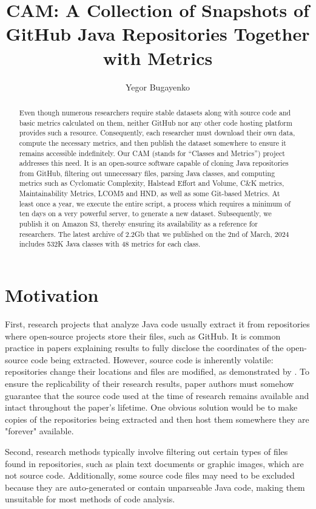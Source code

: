 \documentclass[11pt,sigplan,nonacm]{acmart}
\title{CAM: A Collection of Snapshots of GitHub Java Repositories Together with Metrics}
\author{Yegor Bugayenko}
\affiliation{\institution{Huawei, Russia, Moscow}\city{}\country{}}
\newcommand\cam{{\sffamily CAM}}
\begin{document}
\begin{abstract}
Even though numerous researchers require stable datasets along with source code and basic metrics calculated on them, neither GitHub nor any other code hosting platform provides such a resource. Consequently, each researcher must download their own data, compute the necessary metrics, and then publish the dataset somewhere to ensure it remains accessible indefinitely. Our \cam{} (stands for ``Classes and Metrics'') project addresses this need. It is an open-source software capable of cloning Java repositories from GitHub, filtering out unnecessary files, parsing Java classes, and computing metrics such as Cyclomatic Complexity, Halstead Effort and Volume, C\&K metrics, Maintainability Metrics, LCOM5 and HND, as well as some Git-based Metrics. At least once a year, we execute the entire script, a process which requires a minimum of ten days on a very powerful server, to generate a new dataset. Subsequently, we publish it on Amazon S3, thereby ensuring its availability as a reference for researchers. The latest archive of 2.2Gb that we published on the 2nd of March, 2024 includes 532K Java classes with 48 metrics for each class.
\end{abstract}

\maketitle

\section{Motivation}

First, research projects that analyze Java code usually extract it from repositories where open-source projects store their files, such as GitHub. It is common practice in papers explaining results to fully disclose the coordinates of the open-source code being extracted. However, source code is inherently volatile: repositories change their locations and files are modified, as demonstrated by \citet{5463348}. To ensure the replicability of their research results, paper authors must somehow guarantee that the source code used at the time of research remains available and intact throughout the paper's lifetime. One obvious solution would be to make copies of the repositories being extracted and then host them somewhere they are "forever" available.

Second, research methods typically involve filtering out certain types of files found in repositories, such as plain text documents or graphic images, which are not source code. Additionally, some source code files may need to be excluded because they are auto-generated or contain unparseable Java code, making them unsuitable for most methods of code analysis.
\end{document}
